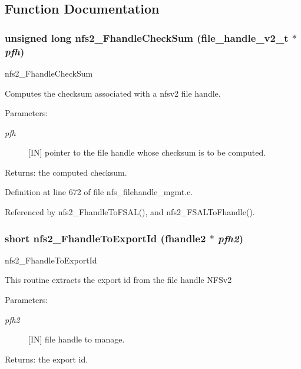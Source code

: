 \subsection{Function Documentation}
\subsubsection{\setlength{\rightskip}{0pt plus 5cm}unsigned long nfs2\_\-Fhandle\-Check\-Sum (file\_\-handle\_\-v2\_\-t $\ast$ {\em pfh})}\label{nfs__filehandle__mgmt_8c_a15}


nfs2\_\-Fhandle\-Check\-Sum

Computes the checksum associated with a nfsv2 file handle.

\begin{Desc}
\item[Parameters:]
\begin{description}
\item[{\em pfh}][IN] pointer to the file handle whose checksum is to be computed.\end{description}
\end{Desc}
\begin{Desc}
\item[Returns:]the computed checksum. \end{Desc}


Definition at line 672 of file nfs\_\-filehandle\_\-mgmt.c.

Referenced by nfs2\_\-Fhandle\-To\-FSAL(), and nfs2\_\-FSALTo\-Fhandle().
\subsubsection{\setlength{\rightskip}{0pt plus 5cm}short nfs2\_\-Fhandle\-To\-Export\-Id (fhandle2 $\ast$ {\em pfh2})}\label{nfs__filehandle__mgmt_8c_a10}


nfs2\_\-Fhandle\-To\-Export\-Id

This routine extracts the export id from the file handle NFSv2

\begin{Desc}
\item[Parameters:]
\begin{description}
\item[{\em pfh2}][IN] file handle to manage.\end{description}
\end{Desc}
\begin{Desc}
\item[Returns:]the export id. \end{Desc}


